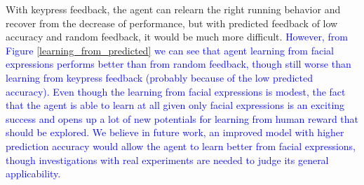 



With keypress feedback, the agent can relearn the right running behavior and recover from the decrease of performance, but with predicted feedback of low accuracy and random feedback, it would be much more difficult. \textcolor{blue}{However, from Figure \ref{learning_from_predicted} we can see that agent learning from facial expressions performs better than from random feedback, though still worse than learning from %
keypress feedback (probably because of the low predicted accuracy). Even though the learning from facial expressions is modest, the fact that the agent is able to learn at all given only facial expressions %
is an exciting success and opens up a lot of new potentials for learning from human reward that should be explored. We believe in future work, an improved model with higher prediction accuracy would allow the agent to learn better from facial expressions, though investigations with real experiments are needed to judge its general applicability.}


